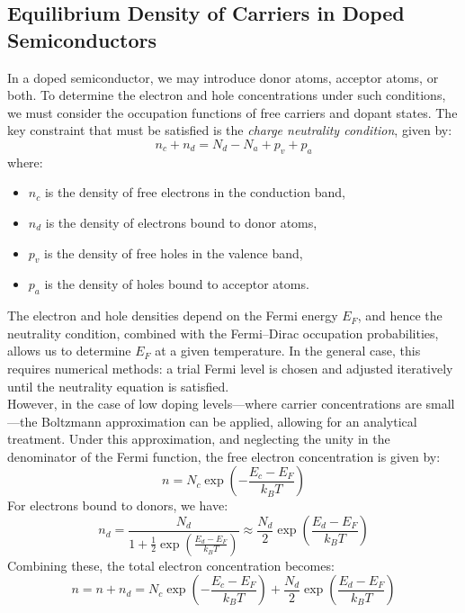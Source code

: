 \subsection{Equilibrium Density of Carriers in Doped Semiconductors}
In a doped semiconductor, we may introduce donor atoms, acceptor atoms, or both. To determine the electron and hole concentrations under such conditions, we must consider the occupation functions of free carriers and dopant states. The key constraint that must be satisfied is the \textit{charge neutrality condition}, given by:
\begin{equation}
	n_c + n_d = N_d - N_a + p_v + p_a
\end{equation}
\noindent
where:
\begin{itemize}
	\item \( n_c \) is the density of free electrons in the conduction band,
	\item \( n_d \) is the density of electrons bound to donor atoms,
	\item \( p_v \) is the density of free holes in the valence band,
	\item \( p_a \) is the density of holes bound to acceptor atoms.
\end{itemize}
\noindent
The electron and hole densities depend on the Fermi energy \( E_F \), and hence the neutrality condition, combined with the Fermi–Dirac occupation probabilities, allows us to determine \( E_F \) at a given temperature. In the general case, this requires numerical methods: a trial Fermi level is chosen and adjusted iteratively until the neutrality equation is satisfied.\\
However, in the case of low doping levels—where carrier concentrations are small—the Boltzmann approximation can be applied, allowing for an analytical treatment. Under this approximation, and neglecting the unity in the denominator of the Fermi function, the free electron concentration is given by:
\begin{equation}
	n = N_c \exp\left( -\frac{E_c - E_F}{k_B T} \right)
\end{equation}
\noindent
For electrons bound to donors, we have:
\begin{equation}
	n_d = \frac{N_d}{1 + \frac{1}{2} \exp\left( \frac{E_d - E_F}{k_B T} \right)} \approx \frac{N_d}{2} \exp\left( \frac{E_d - E_F}{k_B T} \right)
\end{equation}
\noindent
Combining these, the total electron concentration becomes:
\begin{equation}
	n = n + n_d = N_c \exp\left( -\frac{E_c - E_F}{k_B T} \right) + \frac{N_d}{2} \exp\left(\frac{E_d - E_F}{k_B T} \right)
\end{equation}
